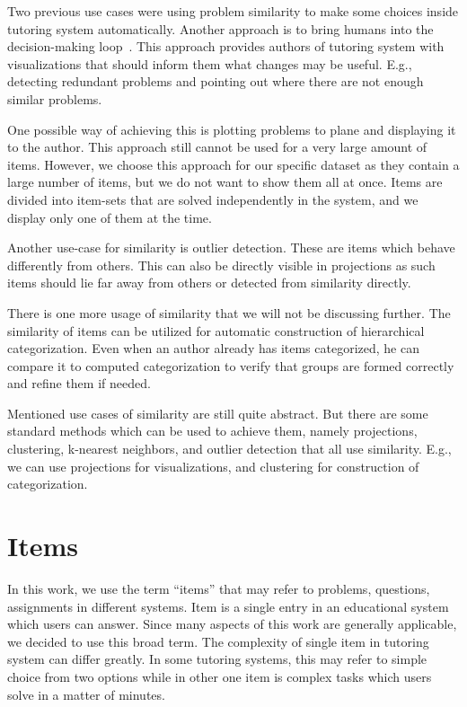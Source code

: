 \documentclass[
  printed, %
  table,   %
  nolof,     %
  nolot,     %
  color,
  final,
  nocover
]{fithesis3}
\begin{document}
Two previous use cases were using problem similarity to make some choices inside tutoring system automatically. Another approach is to bring humans into the decision-making loop~\cite{baker2016stupid}. This approach provides authors of tutoring system with visualizations that should inform them what changes may be useful. E.g., detecting redundant problems and pointing out where there are not enough similar problems.

One possible way of achieving this is plotting problems to plane and displaying it to the author. This approach still cannot be used for a very large amount of items. However, we choose this approach for our specific dataset as they contain a large number of items, but we do not want to show them all at once. Items are divided into item-sets that are solved independently in the system, and we display only one of them at the time.

Another use-case for similarity is outlier detection. These are items which behave differently from others. This can also be directly visible in projections as such items should lie far away from others or detected from similarity directly.

There is one more usage of similarity that we will not be discussing further. The similarity of items can be utilized for automatic construction of hierarchical categorization. Even when an author already has items categorized, he can compare it to computed categorization to verify that groups are formed correctly and refine them if needed.


Mentioned use cases of similarity are still quite abstract. But there are some standard methods which can be used to achieve them, namely projections, clustering, k-nearest neighbors, and outlier detection that all use similarity. E.g., we can use projections for visualizations, and clustering for construction of categorization.


\section{Items}\label{items}


In this work, we use the term ``items'' that may refer to problems, questions, assignments in different systems. Item is a single entry in an educational system which users can answer. Since many aspects of this work are generally applicable, we decided to use this broad term. The complexity of single item in tutoring system can differ greatly. In some tutoring systems, this may refer to simple choice from two options while in other one item is complex tasks which users solve in a matter of minutes.
\end{document}
